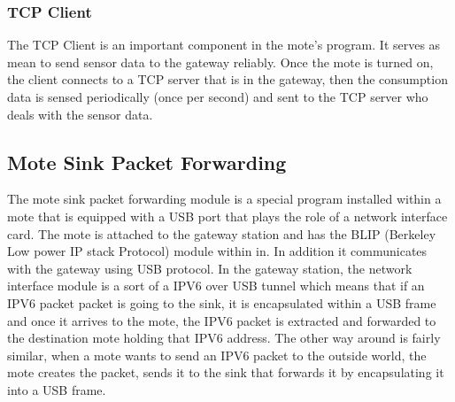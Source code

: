 \documentclass[conference]{IEEEtran}
\begin{document}
\subsubsection{TCP Client}
The TCP Client is an important component in the mote's program. It serves as mean to send sensor data to the gateway reliably. Once the mote is turned on, the client connects to a TCP server that is in the gateway, then the consumption data is sensed periodically (once per second) and sent to the TCP server who deals with the sensor data.

\subsection{Mote Sink Packet Forwarding}
The mote sink packet forwarding module is a special program installed within a mote that is equipped with a USB port that plays the role of a network interface card. The mote is attached to the gateway station and has the BLIP (Berkeley Low power IP stack Protocol) module within in. In addition it communicates with the gateway using USB protocol. In the gateway station, the network interface module is a sort of a IPV6 over USB tunnel which means that if an IPV6 packet packet is going to the sink, it is encapsulated within a USB frame and once it arrives to the mote, the IPV6 packet is extracted and forwarded to the destination mote holding that IPV6 address. The other way around is fairly similar, when a mote wants to send an IPV6 packet to the outside world, the mote creates the packet, sends it to the sink that forwards it by encapsulating it into a USB frame.
\end{document}
